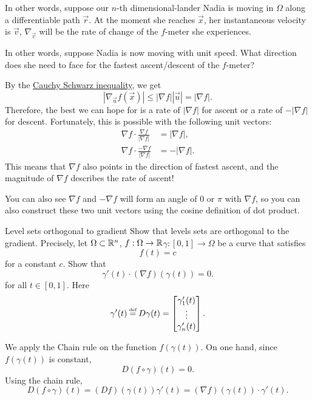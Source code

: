 In other words, suppose our $n$-th dimensional-lander Nadia is moving in $\Omega$ along a differentiable path $\vec{r}$. At the moment she reaches $\vec{x}$, her instantaneous velocity is $\vec{v}$, $\nabla_{\vec{v}}$ will be the rate of change of the $f$-meter she experiences. 

In other words, suppose Nadia is now moving with unit speed. What direction does she need to face for the fastest ascent/descent of the $f$-meter?

By the \hyperref[thm:cauchyschwarz]{Cauchy Schwarz inequality}, we get \[
|\nabla_{\vec{u}}f (\vec{x})| \leq |\nabla f||\vec{u}| = |\nabla f|.
\]
Therefore, the best we can hope for is a rate of $|\nabla f|$ for ascent or a rate of $-|\nabla f|$ for descent. Fortunately, this is possible with the following unit vectors: \begin{align*}
    \nabla f \cdot \frac{\nabla f}{|\nabla f|} &= |\nabla f|,\\
    \nabla f \cdot \frac{-\nabla f}{|\nabla f|}&= -|\nabla f|.
\end{align*}
This means that $\nabla f$ also points in the direction of fastest ascent, and the magnitude of $\nabla f$ describes the rate of ascent! 
\begin{remark}
    You can also see ${\nabla f} $ and $ -\nabla f$ will form an angle of $0$ or $\pi$ with $\nabla f$, so you can also construct these two unit vectors using the cosine definition of dot product.
\end{remark}
\begin{aexample}{Level sets orthogonal to gradient}{}
    Show that levels sets are orthogonal to the gradient. Precisely, let $\Omega\subset \mathbb{R}^n$, $f:\Omega \to \mathbb{R}$$\gamma:[0,1]\to \Omega$ be a curve that satisfies \[
    f(t)=c
    \]
    for a constant $c$. Show that \[
        \gamma'(t) \cdot (\nabla f)(\gamma(t))=0.
    \]
    for all $t\in [0,1]$. Here \[
    \gamma'(t) \defeq D\gamma(t) = \begin{bmatrix}
        \gamma_1'(t)\\\vdots\\\gamma_n'(t)
    \end{bmatrix}.
    \]
\end{aexample}
We apply the Chain rule on the function $f(\gamma(t))$.
On one hand, since $f(\gamma(t))$ is constant, \[
D(f\circ \gamma) (t) = 0.
\]
Using the chain rule, \[
    D(f\circ \gamma) (t) = (Df)(\gamma(t)) \gamma'(t) = (\nabla f)(\gamma(t)) \cdot \gamma'(t).
\]

